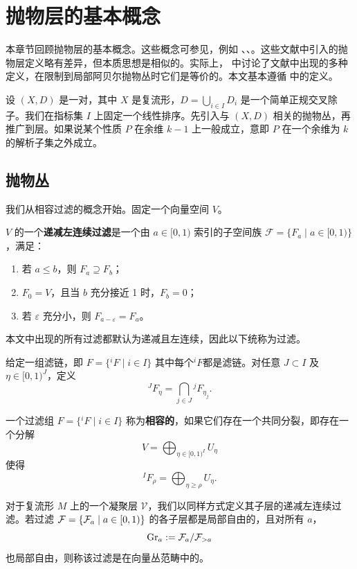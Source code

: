\chapter{抛物层的基本概念}

本章节回顾抛物层的基本概念。这些概念可参见，例如 \cite[Chapter 3]{Mo3}、\cite[Section 2]{Iy-Si}、\cite[Section 1]{Ma-Yo}。这些文献中引入的抛物层定义略有差异，但本质思想是相似的。实际上，\cite{Iy-Si} 中讨论了文献中出现的多种定义，在限制到局部阿贝尔抛物丛时它们是等价的。本文基本遵循 \cite{Mo3} 中的定义。

设 \((X,D)\) 是一对，其中 \(X\) 是复流形，\(D=\bigcup_{i\in I}D_i\) 是一个简单正规交叉除子。我们在指标集 \(I\) 上固定一个线性排序。先引入与 \((X,D)\) 相关的抛物丛，再推广到层。如果说某个性质 \(P\) 在余维 \(k-1\) 上一般成立，意即 \(P\) 在一个余维为 \(k\) 的解析子集之外成立。

\section{抛物丛}

我们从相容过滤的概念开始。固定一个向量空间 \(V\)。

\begin{definition}
\(V\) 的一个\textbf{递减左连续过滤}是一个由 \(a\in[0,1)\) 索引的子空间族 \(\mathcal F=\{F_a\mid a\in[0,1)\}\)，满足：
\begin{enumerate}[label=\arabic*.]
\item 若 \(a\le b\)，则 \(F_a\supseteq F_b\)；
\item \(F_0=V\)，且当 \(b\) 充分接近 1 时，\(F_b=0\)；
\item 若 \(\varepsilon\) 充分小，则 \(F_{a-\varepsilon}=F_a\)。
\end{enumerate}
\end{definition}

本文中出现的所有过滤都默认为递减且左连续，因此以下统称为过滤。

给定一组滤链，即 \(F=\{{}^iF\mid i\in I\}\) 其中每个$^{i}F$都是滤链。对任意 \(J\subset I\) 及 \(\eta\in[0,1)^J\)，定义
\[
{}^JF_\eta=\bigcap_{j\in J} {}^jF_{\eta_j}.
\]

\begin{definition}
一个过滤组 \(F=\{{}^iF\mid i\in I\}\) 称为\textbf{相容的}，如果它们存在一个共同分裂，即存在一个分解
\[
V=\bigoplus_{\eta\in[0,1)^I}U_\eta
\]
使得
\[
{}^IF_\rho=\bigoplus_{\eta\ge \rho} U_\eta.
\]
\end{definition}

对于复流形 \(M\) 上的一个凝聚层 \(\mathcal{V}\)，我们以同样方式定义其子层的递减左连续过滤。若过滤 \(\mathcal F=\{\mathcal{F}_a\mid a\in[0,1)\}\) 的各子层都是局部自由的，且对所有 \(a\)，
\[
\operatorname{Gr}_a:=\mathcal{F}_a/\mathcal{F}_{>a}
\]
也局部自由，则称该过滤是在向量丛范畴中的。

